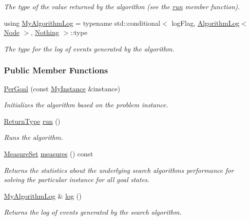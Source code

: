 \begin{DoxyCompactItemize}
\begin{DoxyCompactList}\small\item\em The type of the value returned by the algorithm (see the \hyperlink{structPerGoal_aa9f14202eb691eac98d2b625e2801148}{run} member function). \end{DoxyCompactList}\item 
using \hyperlink{structPerGoal_ad684cf87592474ca6de1b39cc43a3fb2}{My\+Algorithm\+Log} = typename std\+::conditional$<$ log\+Flag, \hyperlink{structAlgorithmLog}{Algorithm\+Log}$<$ \hyperlink{structPerGoal_adbe07e3686a96a917c9008264df2b3cd}{Node} $>$, \hyperlink{structNothing}{Nothing} $>$\+::type\hypertarget{structPerGoal_ad684cf87592474ca6de1b39cc43a3fb2}{}\label{structPerGoal_ad684cf87592474ca6de1b39cc43a3fb2}

\begin{DoxyCompactList}\small\item\em The type for the log of events generated by the algorithm. \end{DoxyCompactList}\end{DoxyCompactItemize}
\subsubsection*{Public Member Functions}
\begin{DoxyCompactItemize}
\item 
\hyperlink{structPerGoal_a511cbd6eed1c05c378b99400be05fce3}{Per\+Goal} (const \hyperlink{structPerGoal_a202c6aec2e84dd9f8cf531ddd385cc78}{My\+Instance} \&instance)
\begin{DoxyCompactList}\small\item\em Initializes the algorithm based on the problem instance. \end{DoxyCompactList}\item 
\hyperlink{structPerGoal_a08b8b1a8d7b60e4c553ff81b37b1b2ac}{Return\+Type} \hyperlink{structPerGoal_aa9f14202eb691eac98d2b625e2801148}{run} ()
\begin{DoxyCompactList}\small\item\em Runs the algorithm. \end{DoxyCompactList}\item 
\hyperlink{structMeasureSet}{Measure\+Set} \hyperlink{structPerGoal_a519c085a7c01d9eb9ce5e09188ea34d7}{measures} () const 
\begin{DoxyCompactList}\small\item\em Returns the statistics about the underlying search algorithm\textquotesingle{}s performance for solving the particular instance for all goal states. \end{DoxyCompactList}\item 
\hyperlink{structPerGoal_ad684cf87592474ca6de1b39cc43a3fb2}{My\+Algorithm\+Log} \& \hyperlink{structPerGoal_a50bf9ef118c6dff15eeb5e0567a1503b}{log} ()
\begin{DoxyCompactList}\small\item\em Returns the log of events generated by the search algorithm. \end{DoxyCompactList}\end{DoxyCompactItemize}
